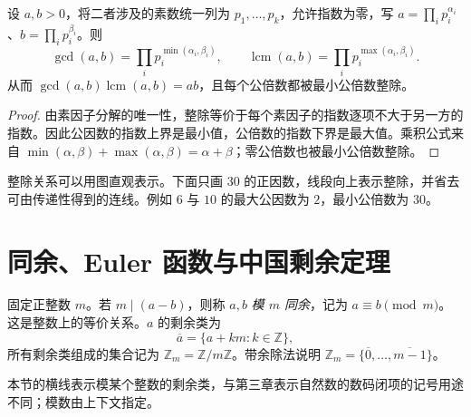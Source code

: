 \documentclass[lang=cn,a4paper,fontset=none,zihao=false,10pt,openany,twoside]{beautybook}
\numberwithin{algorithm}{chapter}
\begin{document}
\begin{corollary}
设 $a,b>0$，将二者涉及的素数统一列为 $p_1,\ldots,p_k$，允许指数为零，写
$a=\prod_i p_i^{\alpha_i}$、$b=\prod_i p_i^{\beta_i}$。则
\[
 \gcd(a,b)=\prod_i p_i^{\min(\alpha_i,\beta_i)},\qquad
 \operatorname{lcm}(a,b)=\prod_i p_i^{\max(\alpha_i,\beta_i)}.
\]
从而 $\gcd(a,b)\operatorname{lcm}(a,b)=ab$，且每个公倍数都被最小公倍数整除。
\end{corollary}
\begin{proof}
由素因子分解的唯一性，整除等价于每个素因子的指数逐项不大于另一方的指数。因此公因数的指数上界是最小值，公倍数的指数下界是最大值。乘积公式来自 $\min(\alpha,\beta)+\max(\alpha,\beta)=\alpha+\beta$；零公倍数也被最小公倍数整除。
\end{proof}

整除关系可以用图直观表示。下面只画 $30$ 的正因数，线段向上表示整除，并省去可由传递性得到的连线。例如 $6$ 与 $10$ 的最大公因数为 $2$，最小公倍数为 $30$。
\begin{center}
\end{center}

\section{同余、Euler 函数与中国剩余定理}\label{sec:congruences-crt}
\begin{definition}[同余与剩余类]
固定正整数 $m$。若 $m\mid(a-b)$，则称 $a,b$ \emph{模 $m$ 同余}，记为 $a\equiv b\pmod m$。这是整数上的等价关系。$a$ 的剩余类为
\[
 \overline a=\{a+km:k\in\mathbb Z\},
\]
所有剩余类组成的集合记为 $\mathbb Z_m=\mathbb Z/m\mathbb Z$。带余除法说明
$\mathbb Z_m=\{\overline0,\ldots,\overline{m-1}\}$。
\end{definition}
本节的横线表示模某个整数的剩余类，与第三章表示自然数的数码闭项的记号用途不同；模数由上下文指定。
\end{document}
